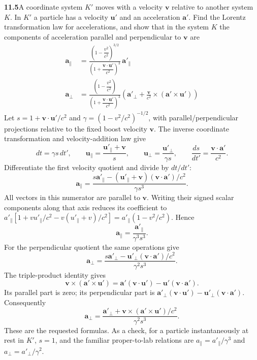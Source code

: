 \par\bigskip
\noindent\textbf{11.5}\quad A coordinate system $K'$ moves with a velocity $\mathbf{v}$ relative to another system $K$. In $K'$ a particle has a velocity $\mathbf{u}'$ and an acceleration $\mathbf{a}'$. Find the Lorentz transformation law for accelerations, and show that in the system $K$ the components of acceleration parallel and perpendicular to $\mathbf{v}$ are
\begin{align*}
\mathbf{a}_{\parallel}&=\frac{\left(1-\dfrac{v^{2}}{c^{2}}\right)^{3/2}}{\left(1+\dfrac{\mathbf{v}\cdot\mathbf{u}'}{c^{2}}\right)^{3}}\,\mathbf{a}'_{\parallel}\\[8pt]
\mathbf{a}_{\perp}&=\frac{\left(1-\dfrac{v^{2}}{c^{2}}\right)}{\left(1+\dfrac{\mathbf{v}\cdot\mathbf{u}'}{c^{2}}\right)^{3}}\left(\mathbf{a}'_{\perp}+\frac{\mathbf{v}}{c^{2}}\times(\mathbf{a}'\times\mathbf{u}')\right)
\end{align*}
\solution
Let $s=1+\mathbf v\cdot\mathbf u'/c^2$ and
$\gamma=(1-v^2/c^2)^{-1/2}$, with parallel/perpendicular projections
relative to the fixed boost velocity $\mathbf v$. The inverse
coordinate transformation and velocity-addition law give
\[
dt=\gamma s\,dt',\qquad
\mathbf u_\parallel=\frac{\mathbf u'_\parallel+\mathbf v}{s},
\qquad\mathbf u_\perp=\frac{\mathbf u'_\perp}{\gamma s},
\qquad\frac{ds}{dt'}=\frac{\mathbf v\cdot\mathbf a'}{c^2}.
\]
Differentiate the first velocity quotient and divide by $dt/dt'$:
\[
\mathbf a_\parallel
=\frac{s\mathbf a'_\parallel
-(\mathbf u'_\parallel+\mathbf v)(\mathbf v\cdot\mathbf a')/c^2}
{\gamma s^3}.
\]
All vectors in this numerator are parallel to $\mathbf v$.
Writing their signed scalar components along that axis reduces its
coefficient to
$a'_\parallel[1+vu'_\parallel/c^2
-v(u'_\parallel+v)/c^2]=a'_\parallel(1-v^2/c^2)$.
Hence
\[
\boxed{\mathbf a_\parallel=\frac{\mathbf a'_\parallel}{\gamma^3s^3}.}
\]
For the perpendicular quotient the same operations give
\[
\mathbf a_\perp=
\frac{s\mathbf a'_\perp
-\mathbf u'_\perp(\mathbf v\cdot\mathbf a')/c^2}{\gamma^2s^3}.
\]
The triple-product identity gives
\[
\mathbf v\times(\mathbf a'\times\mathbf u')
=\mathbf a'(\mathbf v\cdot\mathbf u')
-\mathbf u'(\mathbf v\cdot\mathbf a').
\]
Its parallel part is zero; its perpendicular part is
$\mathbf a'_\perp(\mathbf v\cdot\mathbf u')
-\mathbf u'_\perp(\mathbf v\cdot\mathbf a')$.
Consequently
\[
\boxed{\mathbf a_\perp=
\frac{\mathbf a'_\perp+
\mathbf v\times(\mathbf a'\times\mathbf u')/c^2}{\gamma^2s^3}.}
\]
These are the requested formulas. As a check, for a particle
instantaneously at rest in $K'$, $s=1$, and the familiar proper-to-lab
relations are $a_\parallel=a'_\parallel/\gamma^3$ and
$a_\perp=a'_\perp/\gamma^2$.

